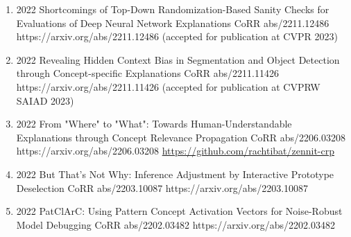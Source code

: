 {\begin{enumerate}
        \item {}
                        {2022}
                        {Shortcomings of Top-Down Randomization-Based Sanity Checks for Evaluations of Deep Neural Network Explanations}
                        {CoRR abs/2211.12486}
                        {https://arxiv.org/abs/2211.12486}
                        {(accepted for publication at CVPR 2023)}

        \item {}
                        {2022}
                        {Revealing Hidden Context Bias in Segmentation and Object Detection through Concept-specific Explanations}
                        {CoRR abs/2211.11426}
                        {https://arxiv.org/abs/2211.11426}
                        {(accepted for publication at CVPRW SAIAD 2023)}

        \item {}
                        {2022}
                        {From "Where" to "What": Towards Human-Understandable Explanations through Concept Relevance Propagation}
                        {CoRR abs/2206.03208}
                        {https://arxiv.org/abs/2206.03208}
                        {\href{https://github.com/rachtibat/zennit-crp}{https://github.com/rachtibat/zennit-crp}}

        \item {}
                            {2022}
                            {But That's Not Why: Inference Adjustment by Interactive Prototype Deselection}
                            {CoRR abs/2203.10087}
                            {https://arxiv.org/abs/2203.10087}

        \item {}
                            {2022}
                            {PatClArC: Using Pattern Concept Activation Vectors for Noise-Robust Model Debugging}
                            {CoRR abs/2202.03482}
                            {https://arxiv.org/abs/2202.03482}


\end{enumerate}}
